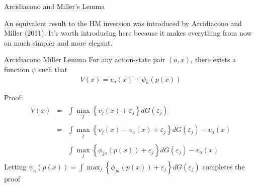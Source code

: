 \documentclass[xcolor=pdftex,dvipsnames,table,mathserif,aspectratio=169]{beamer}
\begin{document}
\begin{frame}{Arcidiacono and Miller's Lemma}

An equivalent result to the HM inversion was introduced by Arcidiacono and Miller (2011). 
It's worth introducing here because it makes everything from now on much simpler
and more elegant.


\begin{block}{Arcidiacono Miller Lemma}
For any action-state pair $\left(a,x\right)$, there exists a function
$\psi$ such that 
\begin{eqnarray*}
V\left(x\right)=v_{a}\left(x\right)+\psi_{a}\left(p\left(x\right)\right)
\end{eqnarray*}
\end{block}

Proof:
\begin{eqnarray*}
\begin{array}{ccl}
V\left(x\right) & = & \int\max_{j}\left\{ v_{j}\left(x\right)+\varepsilon_{j}\right\} dG\left(\varepsilon_{j}\right)\\
\\
 & = & \int\max_{j}\left\{ v_{j}\left(x\right)-v_{a}\left(x\right)+\varepsilon_{j}\right\} dG\left(\varepsilon_{j}\right)-v_{a}\left(x\right)\\
\\
 &  & \int\max_{j}\left\{ \phi_{ja}\left(p\left(x\right)\right)+\varepsilon_{j}\right\} dG\left(\varepsilon_{j}\right)-v_{a}\left(x\right)
\end{array}
\end{eqnarray*}
Letting $\psi_{a}\left(p\left(x\right)\right)=\int\max_{j}\left\{ \phi_{ja}\left(p\left(x\right)\right)+\varepsilon_{j}\right\} dG\left(\varepsilon_{j}\right)$ completes the proof
\end{frame}
\end{document}
